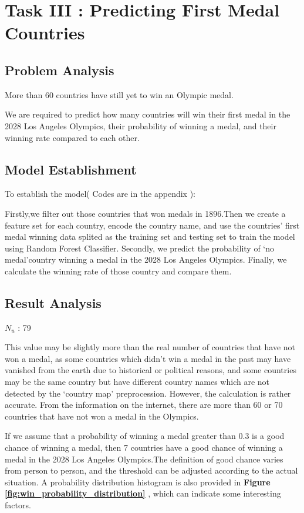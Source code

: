 \section{Task III : Predicting First Medal Countries}
\subsection{Problem Analysis}

More than 60 countries have still yet to win an Olympic medal.

We are required to predict how many countries will win their first medal in the 2028 Los Angeles Olympics, their probability of winning a medal, and their winning rate compared to each other.
\subsection{Model Establishment}

To establish the model( Codes are in the appendix ):

Firstly,we filter out those countries that won medals in 1896.Then we create a feature set for each country, encode the country name, and use the countries' first medal winning data splited as the training set and testing set to train the model using Random Forest Classifier.
Secondly, we predict the probability of `no medal'country winning a medal in the 2028 Los Angeles Olympics.
Finally, we calculate the winning rate of those country and compare them.



\subsection{Result Analysis}
$N_u$ : 79

This value may be slightly more than the real number of countries that have not won a medal, as some countries which didn't win a medal in the past may have vanished from the earth due to historical or political reasons, and some countries may be the same country but have different country names which are not detected by the `country map' preprocession. However, the calculation is rather accurate. From the information on the internet, there are more than 60 or 70 countries that have not won a medal in the Olympics.

If we assume that a probability of winning a medal greater than 0.3 is a good chance of winning a medal, then 7 countries have a good chance of winning a medal in the 2028 Los Angeles Olympics.The definition of good chance varies from person to person, and the threshold can be adjusted according to the actual situation. A probability distribution histogram is also provided in \textbf{Figure \ref{fig:win_probability_distribution}} , which can indicate some interesting factors.


